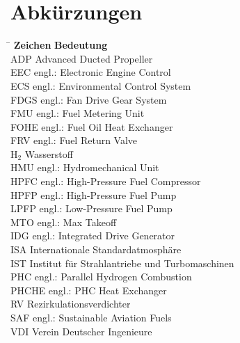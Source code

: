 \section*{Abkürzungen}

\begin{tabbing}
	\hspace*{3cm} \= \hspace*{8cm} \kill
	\textbf{Zeichen} \> \textbf{Bedeutung} 							\\[5mm]
    ADP     \>  Advanced Ducted Propeller                           \\
    EEC     \>  engl.: Electronic Engine Control                    \\
    ECS     \>  engl.: Environmental Control System                 \\
    FDGS    \>  engl.: Fan Drive Gear System                        \\
    FMU     \>  engl.: Fuel Metering Unit                           \\
    FOHE    \>  engl.: Fuel Oil Heat Exchanger                      \\
    FRV     \>  engl.: Fuel Return Valve                            \\
    H$_2$ 	\> 	Wasserstoff 										\\
    HMU     \>  engl.: Hydromechanical Unit                         \\
    HPFC    \>  engl.: High-Pressure Fuel Compressor                \\
    HPFP    \>  engl.: High-Pressure Fuel Pump                      \\
    LPFP    \>  engl.: Low-Pressure Fuel Pump                       \\
    MTO     \>  engl.: Max Takeoff                                  \\
    IDG     \>  engl.: Integrated Drive Generator                   \\
    ISA     \>  Internationale Standardatmosphäre                   \\
	IST		\> 	Institut für Strahlantriebe und Turbomaschinen		\\
    PHC     \>  engl.: Parallel Hydrogen Combustion                 \\
    PHCHE   \>  engl.: PHC Heat Exchanger                           \\
    RV      \>  Rezirkulationsverdichter                            \\
    SAF 	\> 	engl.: Sustainable Aviation Fuels 					\\
	VDI		\>	Verein Deutscher Ingenieure							\\

\end{tabbing}